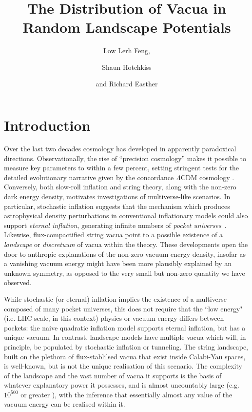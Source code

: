 \documentclass[12pt]{article}
\title{The Distribution of Vacua in Random Landscape Potentials}
\author{Low Lerh Feng,}
\author{Shaun Hotchkiss}
\author{and Richard Easther}
\affiliation{Department of Physics,\\ University of Auckland, \\Private Bag 92019,\\ Auckland, New Zealand}
\begin{document}
\maketitle

\section{Introduction}

Over the last two decades cosmology has developed in apparently paradoxical directions. Observationally, the rise of ``precision cosmology'' makes it possible to measure key parameters to within a few percent, setting stringent tests for the detailed evolutionary narrative given by the concordance $\Lambda$CDM cosmology \cite{Planck2018,DES}. Conversely, both slow-roll inflation and string theory, along with the non-zero  dark energy density,  motivates  investigations of multiverse-like scenarios. In particular, stochastic inflation \cite{Linde1986,Adshead2007} suggests that the mechanism which produces astrophysical density perturbations in conventional inflationary models could also support {\em eternal inflation\/}, generating infinite numbers of  {\em pocket universes\/}~\cite{Guth2001}. Likewise, flux-compactified string vacua point to a possible existence of a  {\em landscape\/} \cite{Susskind2003} or {\em discretuum\/} \cite{Bousso2000}   of vacua within the theory. These developments open the door to anthropic explanations of the non-zero vacuum energy density, insofar as a vanishing vacuum energy might have been more plausibly explained by an unknown symmetry, as opposed to the very small but non-zero quantity we have observed. 

While stochastic (or eternal) inflation implies the existence of a multiverse composed of many pocket universes,  this does not require that the ``low energy" (i.e. LHC scale, in this context) physics or vacuum energy differs between pockets:  the naive quadratic inflation model supports eternal inflation, but has a unique vacuum.  In contrast, landscape models have multiple vacua which will, in principle, be populated by stochastic inflation or tunneling. The string landscape, built on the plethora of flux-stablilsed vacua that exist inside Calabi-Yau spaces, is well-known, but is not the unique realisation of this scenario. The complexity of the landscape  and the vast number of vacua it supports is the basis of whatever explanatory power it possesses, and is almost uncountably large (e.g. $10^{500}$ or greater \cite{Douglas2003}), with the inference that essentially almost any value of the vacuum energy can be realised within it. 
 
\end{document}
